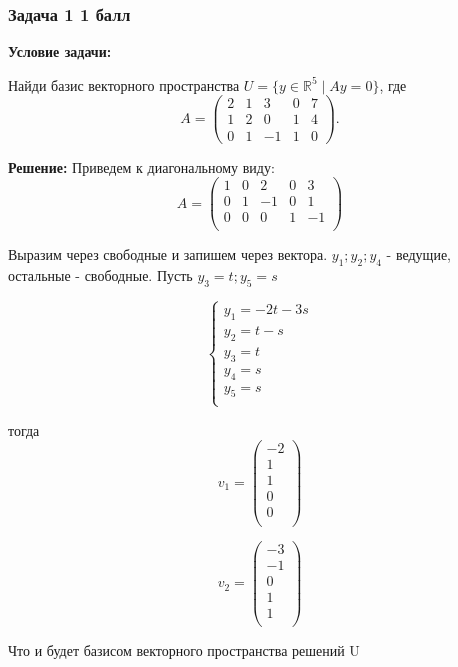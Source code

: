 \documentclass[a4paper,12pt]{article}
\begin{document}
\subsubsection{Задача 1 \hfill 1 балл}
\textbf{Условие задачи:}

Найди базис векторного пространства \( U = \{y \in \mathbb{R}^5 \mid Ay = 0\} \), где
\[
A =
\begin{pmatrix}
2 & 1 & 3 & 0 & 7 \\
1 & 2 & 0 & 1 & 4 \\
0 & 1 & -1 & 1 & 0
\end{pmatrix}.
\]

\textbf{Решение:}
Приведем к диагональному виду: 
\[
A = 
\begin{pmatrix}
1 & 0 & 2 & 0 & 3 \\
0 & 1 & -1 & 0 & 1 \\
0 & 0 & 0 & 1 & -1 \\
\end{pmatrix}
\]

Выразим через свободные и запишем через вектора. $y_1;y_2;y_4$ - ведущие, остальные - свободные. Пусть $y_3=t;y_5=s$

\[
\begin{cases}
y_1 = -2t -3s\\
y_2 = t - s\\
y_3 = t\\
y_4 = s\\
y_5 = s\\
\end{cases}
\]


тогда 
\[
v_1 = \begin{pmatrix}
-2 \\
1 \\
1 \\
0 \\
0 \\
\end{pmatrix}
\]

\[
v_2 = \begin{pmatrix}
-3 \\
-1 \\
0 \\
1 \\
1 \\
\end{pmatrix}
\]

Что и будет базисом векторного пространства решений U






\newpage
\end{document}
